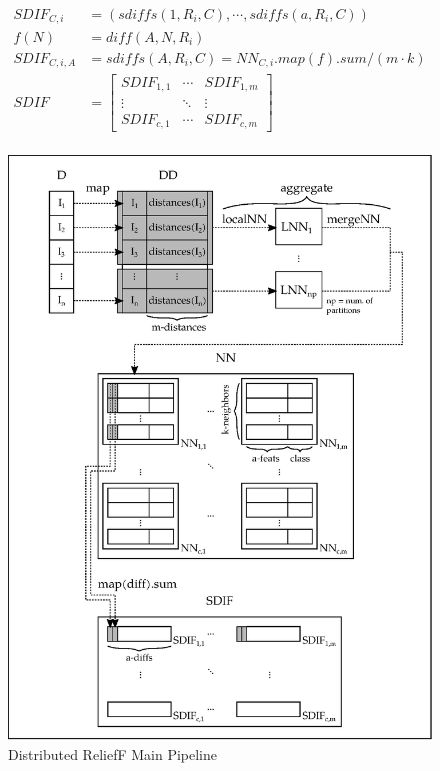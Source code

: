 \begin{align}
\label{eq:sumOfDiffsMatrix}
SDIF_{C,i} & = (sdiffs(1,R_i,C),\cdots,sdiffs(a,R_i,C)) \nonumber \\
f(N) & = diff(A,N,R_i) \nonumber \\
SDIF_{C,i,A} & = sdiffs(A,R_i,C) = NN_{C,i}.map(f).sum / (m \cdot k) \nonumber \\
SDIF & = \begin{bmatrix}
SDIF_{1,1} & \cdots  & SDIF_{1,m}\\ 
\vdots & \ddots  & \vdots \\ 
SDIF_{c,1} & \cdots & SDIF_{c,m} 
\end{bmatrix} \nonumber \\
\end{align}


\begin{figure}
  \includegraphics[width=1\textwidth]{figures/fig2.eps}
\caption{Distributed ReliefF Main Pipeline}
\label{fig:relieffMain}
\end{figure}

